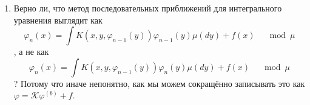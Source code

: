 \documentclass{letter}
\newcommand{\vfi}{\varphi}
\begin{document}
\begin{enumerate}
\item Верно ли, что метод последовательных приближений для интегрального уравнения выглядит как $$\vfi_n\left(x\right) = \int K\left(x, y, \vfi_{n-1}\left(y\right)\right)\vfi_{n-1}\left(y\right) \mu\left(dy\right) + f\left(x\right) \quad \mod \mu$$, а не как $$\vfi_n\left(x\right) = \int K\left(x, y, \vfi_{n-1}\left(y\right)\right)\vfi_n\left(y\right) \mu\left(dy\right) + f\left(x\right) \quad \mod \mu$$? Потому что иначе непонятно, как мы можем сокращённо записывать это как $\vfi = \mathcal{K}\vfi^{\left(b\right)} + f$.
\end{enumerate}
\end{document}
